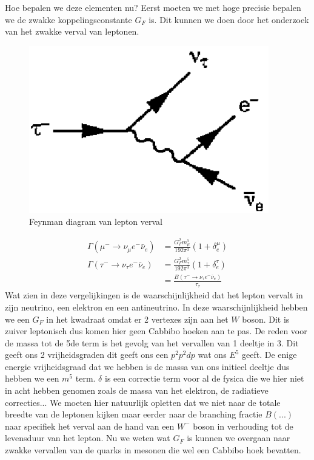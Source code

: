 \documentclass[../main.tex]{subfiles}
\begin{document}
Hoe bepalen we deze elementen nu? Eerst moeten we met hoge precisie bepalen we de zwakke koppelingsconstante $G_F$ is. Dit kunnen we doen door het onderzoek van het zwakke verval van leptonen.

\begin{figure}[h]
    \centering
    \includegraphics[width=0.5\linewidth]{meson_mixing_and_oscillations/zwak_lep_verval.png}
    \caption{Feynman diagram van lepton verval}%
    \label{fig:meson_mixing_and_oscillations/zwak_lep_verval}
\end{figure}

\begin{equation}
    \begin{aligned}
        \label{eq:lep_verval_zwak}
        \Gamma\left(\mu^{-} \rightarrow \nu_{\mu} e^{-} \bar{\nu}_{e}\right) &=\frac{G_{F}^{2} m_{\mu}^{5}}{192 \pi^{3}}\left(1+\delta_{e}^{\mu}\right) \\
        \Gamma\left(\tau^{-} \rightarrow \nu_{\tau} e^{-} \bar{\nu}_{e}\right) &=\frac{G_{F}^{2} m_{\tau}^{5}}{192 \pi^{3}}\left(1+\delta_{e}^{\tau}\right) \\
                                                                               &=\frac{B\left(\tau^{-} \rightarrow \nu_{\tau} e^{-} \bar{\nu}_{e}\right)}{\tau_{\tau}}
    \end{aligned}
\end{equation}
Wat zien in deze vergelijkingen is de waarschijnlijkheid dat het lepton vervalt in zijn neutrino, een elektron en een antineutrino. In deze waarschijnlijkheid hebben we een $G_F$ in het kwadraat omdat er 2 vertexes zijn aan het $W$ boson. Dit is zuiver leptonisch dus komen hier geen Cabbibo hoeken aan te pas. De reden voor de massa tot de 5de term is het gevolg van het vervallen van 1 deeltje in 3. Dit geeft ons 2 vrijheidsgraden dit geeft ons een $p^2p^2dp$ wat ons $E^5$ geeft. De enige energie vrijheidsgraad dat we hebben is de massa van ons initieel deeltje dus hebben we een $m^5$ term. $\delta$ is een correctie term voor al de fysica die we hier niet in acht hebben genomen zoals de massa van het elektron, de radiatieve correcties... We moeten hier natuurlijk opletten dat we niet naar de totale breedte van de leptonen kijken maar eerder naar de branching fractie $B(...)$ naar specifiek het verval aan de hand van een $W^-$ boson in verhouding tot de levensduur van het lepton. Nu we weten wat $G_F$ is kunnen we overgaan naar zwakke vervallen van de quarks in mesonen die wel een Cabbibo hoek bevatten.
\end{document}
